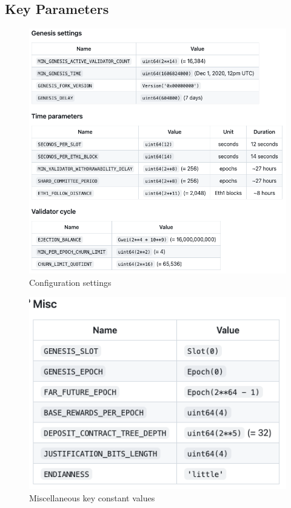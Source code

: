 \documentclass[UTF8]{article}
\begin{document}
 \subsection{Key Parameters }
\begin{figure}[htbp]
\begin{center}
\includegraphics[width=0.9\linewidth]{images/configvalues}
\caption{Configuration settings}
\label{fig:config}
\end{center}
\end{figure}

\begin{figure}[htbp]
\begin{center}
\includegraphics[width=0.4\linewidth]{images/constants}
\caption{Miscellaneous key constant values}
\label{fig:constants}
\end{center}
\end{figure}
\end{document}
